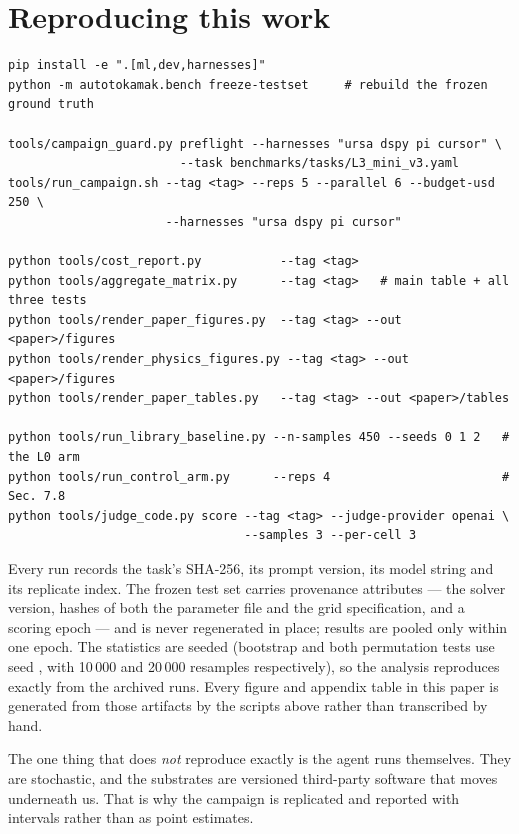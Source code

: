 \section{Reproducing this work}
\label{app:repro}

{\footnotesize
\begin{verbatim}
pip install -e ".[ml,dev,harnesses]"
python -m autotokamak.bench freeze-testset     # rebuild the frozen ground truth

tools/campaign_guard.py preflight --harnesses "ursa dspy pi cursor" \
                        --task benchmarks/tasks/L3_mini_v3.yaml
tools/run_campaign.sh --tag <tag> --reps 5 --parallel 6 --budget-usd 250 \
                      --harnesses "ursa dspy pi cursor"

python tools/cost_report.py           --tag <tag>
python tools/aggregate_matrix.py      --tag <tag>   # main table + all three tests
python tools/render_paper_figures.py  --tag <tag> --out <paper>/figures
python tools/render_physics_figures.py --tag <tag> --out <paper>/figures
python tools/render_paper_tables.py   --tag <tag> --out <paper>/tables

python tools/run_library_baseline.py --n-samples 450 --seeds 0 1 2   # the L0 arm
python tools/run_control_arm.py      --reps 4                        # Sec. 7.8
python tools/judge_code.py score --tag <tag> --judge-provider openai \
                                 --samples 3 --per-cell 3
\end{verbatim}
}

Every run records the task's SHA-256, its prompt version, its model string and
its replicate index. The frozen test set carries provenance attributes --- the
solver version, hashes of both the parameter file and the grid specification,
and a scoring epoch --- and is never regenerated in place; results are pooled
only within one epoch. The statistics are seeded (bootstrap and both
permutation tests use seed \code{20260917}, with 10\,000 and 20\,000 resamples
respectively), so the analysis reproduces exactly from the archived runs. Every
figure and appendix table in this paper is generated from those artifacts by
the scripts above rather than transcribed by hand.

The one thing that does \emph{not} reproduce exactly is the agent runs
themselves. They are stochastic, and the substrates are versioned third-party
software that moves underneath us. That is why the campaign is replicated and
reported with intervals rather than as point estimates.

